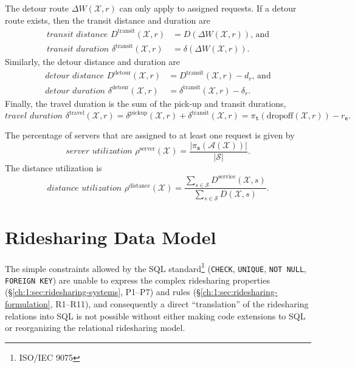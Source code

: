 The detour route $\Delta W(\mathcal{X},r)$ can only apply to assigned requests. If
a detour route exists, then
the transit distance and duration are
\begin{align}
\label{eq:transit-distance}
\textit{transit distance }D^\textrm{transit}(\mathcal{X},r)&=D(\Delta W(\mathcal{X},r))\textrm{, and}\\
\label{eq:transit-duration}
\textit{transit duration }\delta^\textrm{transit}(\mathcal{X},r)&=\delta(\Delta W(\mathcal{X},r)).
\end{align}
Similarly, the detour distance and duration are
\begin{align}
\label{eq:detour-distance}
\textit{detour distance }D^\textrm{detour}(\mathcal{X},r)&=D^\textrm{transit}(\mathcal{X},r)-d_r\textrm{, and}\\
\label{eq:detour-duration}
\textit{detour duration }\delta^\textrm{detour}(\mathcal{X},r)&=\delta^\textrm{transit}(\mathcal{X},r)-\delta_r.
\end{align}
Finally, the travel duration is the sum of the pick-up and transit durations,
\begin{equation}
\label{eq:travel-duration}
\textit{travel duration }\delta^\textrm{travel}(\mathcal{X},r)=\delta^\textrm{pickup}(\mathcal{X},r)+\delta^\textrm{transit}(\mathcal{X},r)
=\pi_\texttt{t}(\textrm{dropoff}(\mathcal{X},r))-r_\texttt{e}.
\end{equation}

The percentage of servers that are assigned to at least one request is given by
\begin{equation}
\label{eq:server-utilization}
\textit{server utilization }\rho^\textrm{server}(\mathcal{X})=\frac{|\pi_\texttt{s}(\mathcal{A}(\mathcal{X}))|}{|\mathcal{S}|}.
\end{equation}
The distance utilization is
\begin{equation}
\label{eq:distance-utilization}
\textit{distance utilization }\rho^\textrm{distance}(\mathcal{X})=
\frac{\sum_{s\in\mathcal{S}}D^\textrm{service}(\mathcal{X},s)}
{\sum_{s\in\mathcal{S}}D(\mathcal{X},s)}.
\end{equation}

\section{Ridesharing Data Model}
\label{ch:1:sec:ridesharing-data-model}
The simple constraints allowed by the SQL standard\footnote{ISO/IEC 9075}
(\texttt{CHECK}, \texttt{UNIQUE}, \texttt{NOT NULL}, \texttt{FOREIGN KEY}) are
unable to express the complex ridesharing properties
(\S\ref{ch:1:sec:ridesharing-systems}, P1--P7) and rules
(\S\ref{ch:1:sec:ridesharing-formulation}, R1--R11), and consequently a direct
``translation'' of the ridesharing relations into SQL is not possible without
either making code extensions to SQL or reorganizing the relational ridesharing
model.

